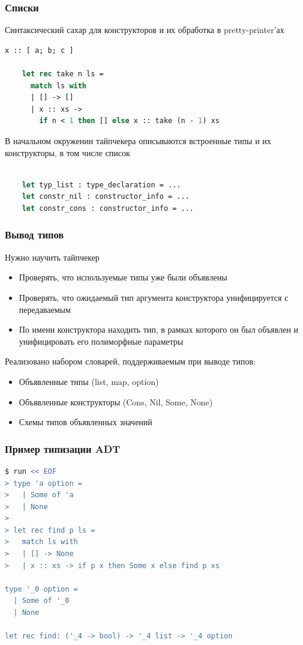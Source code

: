 \documentclass
  [ russian
  , aspectratio=43
  ] {beamer}
\begin{document}
\begin{frame}[fragile]
    \frametitle{Списки}

    Синтаксический сахар для конструкторов и их обработка в pretty-printer'ах
    \begin{lstlisting}[language=ML]
    x :: [ a; b; c ]

    let rec take n ls =
      match ls with
      | [] -> []
      | x :: xs ->
        if n < 1 then [] else x :: take (n - 1) xs
    \end{lstlisting}

    В начальном окружении тайпчекера описываются встроенные типы и их конструкторы, в том числе список
    \begin{lstlisting}[language=ML]

    let typ_list : type_declaration = ...
    let constr_nil : constructor_info = ...
    let constr_cons : constructor_info = ...
    \end{lstlisting}
\end{frame}


\begin{frame}
    \frametitle{Вывод типов}
    Нужно научить тайпчекер
    \begin{itemize}
        \item Проверять, что используемые типы уже были объявлены
        \item Проверять, что ожидаемый тип аргумента конструктора унифицируется с передаваемым
        \item По имени конструктора находить тип, в рамках которого он был объявлен и унифицировать его полиморфные параметры
    \end{itemize}


    Реализовано набором словарей, поддерживаемым при выводе типов:
    \begin{itemize}
        \item Объявленные типы (\texttt\small{list, map, option})
        \item Объявленные конструкторы (\texttt\small{Cons, Nil, Some, None})
        \item Схемы типов объявленных значений
    \end{itemize}
\end{frame}


\begin{frame}[fragile]
    \frametitle{Пример типизации ADT}
    \begin{lstlisting}[language=ML]
$ run << EOF
> type 'a option =
>   | Some of 'a
>   | None
>
> let rec find p ls =
>   match ls with
>   | [] -> None
>   | x :: xs -> if p x then Some x else find p xs

type '_0 option =
  | Some of '_0
  | None

let rec find: ('_4 -> bool) -> '_4 list -> '_4 option
		\end{lstlisting}
\end{frame}
\end{document}
